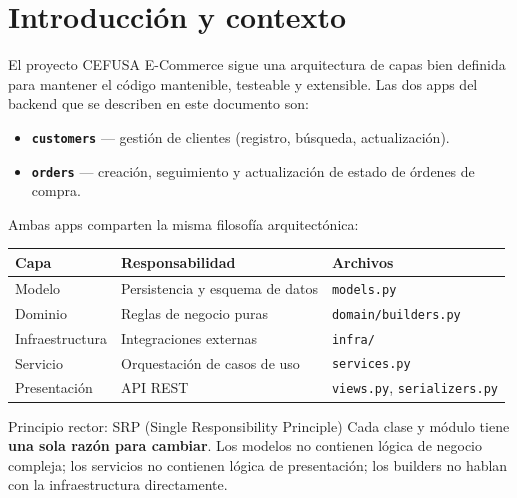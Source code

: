 \documentclass[12pt, a4paper]{article}
\begin{document}
\section{Introducción y contexto}

El proyecto CEFUSA E-Commerce sigue una arquitectura de capas bien definida para mantener el código mantenible, testeable y extensible. Las dos apps del backend que se describen en este documento son:

\begin{itemize}
    \item \textbf{\texttt{customers}} — gestión de clientes (registro, búsqueda, actualización).
    \item \textbf{\texttt{orders}} — creación, seguimiento y actualización de estado de órdenes de compra.
\end{itemize}

Ambas apps comparten la misma filosofía arquitectónica:

\begin{center}
\begin{tabular}{@{}lll@{}}
    \toprule
    \textbf{Capa} & \textbf{Responsabilidad} & \textbf{Archivos} \\
    \midrule
    Modelo        & Persistencia y esquema de datos & \texttt{models.py} \\
    Dominio       & Reglas de negocio puras         & \texttt{domain/builders.py} \\
    Infraestructura & Integraciones externas         & \texttt{infra/} \\
    Servicio      & Orquestación de casos de uso    & \texttt{services.py} \\
    Presentación  & API REST                        & \texttt{views.py}, \texttt{serializers.py} \\
    \bottomrule
\end{tabular}
\end{center}

\vspace{1em}

\begin{conceptbox}{Principio rector: SRP (Single Responsibility Principle)}
Cada clase y módulo tiene \textbf{una sola razón para cambiar}. Los modelos no contienen lógica de negocio compleja; los servicios no contienen lógica de presentación; los builders no hablan con la infraestructura directamente.
\end{conceptbox}

\newpage
\end{document}

